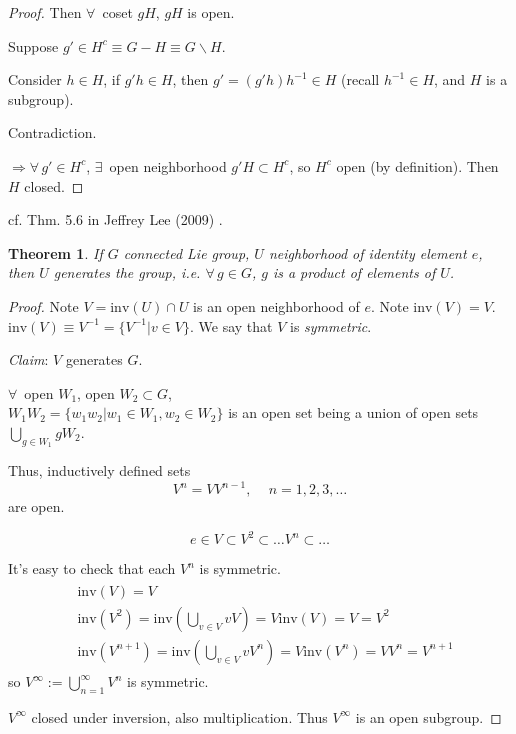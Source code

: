 \documentclass[10pt]{amsart}
\newtheorem{theorem}{Theorem}
\begin{document}
\begin{multicols*}{2}
\begin{proof}
	Then $\forall \, $ coset $gH$, $gH$ is open.
	
	Suppose $g' \in H^c \equiv G-H \equiv G\backslash H$.
	
	Consider $h\in H$, if $g'h \in H$, then $g' = (g'h)h^{-1} \in H$ (recall $h^{-1} \in H$, and $H$ is a subgroup).
	
	Contradiction.
	
	$\Longrightarrow \forall \, g' \in H^c$, $\exists \, $ open neighborhood $g'H \subset H^c$, so $H^c$ open (by definition). Then $H$ closed.
	
	\end{proof}

cf. Thm. 5.6 in Jeffrey Lee (2009) \cite{JLee2009}.
\begin{theorem}
	If $G$ connected Lie group, $U$ neighborhood of identity element $e$, then $U$ generates the group, i.e. $\forall \, g \in G$, $g$ is a product of elements of $U$.
\end{theorem}

\begin{proof}
	Note $V = \text{inv}(U) \cap U$ is an open neighborhood of $e$. Note $\text{inv}(V) =V$. $\text{inv}(V) \equiv V^{-1} = \lbrace V^{-1} | v \in V \rbrace$. We say that $V$ is \emph{symmetric}.
	
	\emph{Claim}: $V$ generates $G$.
	
	$\forall \, $ open $W_1$, open $W_2\subset G$, \\
	$W_1W_2 = \lbrace w_1 w_2 | w_1 \in W_1, w_2 \in W_2 \rbrace$ is an open set being a union of open sets $\bigcup_{g\in W_1} gW_2$.
	
	Thus, inductively defined sets
	\[
	V^n = VV^{n-1}, \quad \, n = 1,2,3,\dots
	\]
	are open.
	
	\[
	e \in V \subset V^2 \subset \dots V^n \subset \dots
	\]
	
	It's easy to check that each $V^n$ is symmetric.
	\[
	\begin{gathered}
	\begin{aligned}
	& \text{inv}(V) = V \\
	& \text{inv}(V^2) = \text{inv}( \bigcup_{v\in V} vV) = V \text{inv}(V) = V = V^2 \\
	& \text{inv}(V^{n+1}) = \text{inv}\left( \bigcup_{v\in V} vV^n \right) = V \text{inv}(V^n) = VV^n = V^{n+1}
	\end{aligned}
	\end{gathered}	
	\]
	so $V^{\infty} := \bigcup_{n=1}^{\infty} V^n$ is symmetric.

$V^{\infty}$ closed under inversion, also multiplication. Thus $V^{\infty}$ is an open subgroup.


\end{proof}
\end{multicols*}
\end{document}
